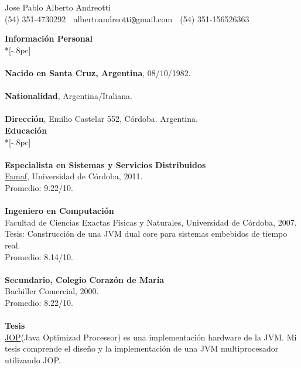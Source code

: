 \documentclass[a4paper,11pt,english]{article}
\begin{document}
\begin{center}
{\Large Jose Pablo Alberto Andreotti} \\[.5pc]
(54) 351-4730292 $\;$ albertoandreotti\verb|@|gmail.com $\;$ (54) 351-156526363 \\[3pc]
\end{center}
{\large \bf Informaci\'on Personal } \\*[-.8pc]
\underline{\hspace{6in}} \\
\\
{\bf Nacido en Santa Cruz, Argentina}, 08/10/1982.\\
\\
{\bf Nationalidad}, Argentina/Italiana.\\
\\
{\bf Direcci\'on}, Emilio Castelar 552, C\'ordoba. Argentina.\\

{\large \bf Educaci\'on} \\*[-.8pc]
\underline{\hspace{6in}} \\
\\
{\bf Especialista en Sistemas y Servicios Distribuidos}\\
\href{http://www.famaf.unc.edu.ar/}{Famaf}, Universidad de C\'ordoba, 2011. \\
Promedio: 9.22/10. \\
\\
{\bf Ingeniero en Computaci\'on}\\
Facultad de Ciencias Exactas F\'isicas y Naturales, Universidad de C\'ordoba, 2007.\\
Tesis: Construcci\'on de una JVM dual core para sistemas embebidos de tiempo real.\\
Promedio: 8.14/10. \\
\\
{\bf Secundario, Colegio Coraz\'on de Mar\'ia}\\
Bachiller Comercial, 2000.\\
Promedio: 8.22/10.\\
\\
{\bf Tesis} \\
\href{http://www.jopdesign.com}{JOP}(Java Optimizad Processor) es una implementaci\'on hardware de la JVM.
Mi tesis comprende el dise\~{n}o y la implementaci\'on de una JVM multiprocesador utilizando JOP.\\
\end{document}
